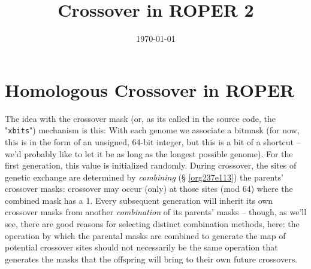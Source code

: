 \documentclass[11pt]{article}
\date{\today}
\title{Crossover in ROPER 2}
\begin{document}
\maketitle
\tableofcontents


\section{Homologous Crossover in ROPER}
\label{sec:org2bd754a}
The idea with the crossover mask (or, as its called in the source code, the
"\texttt{xbits}") mechanism is this: With each genome we associate a bitmask (for now,
this is in the form of an unsigned, 64-bit integer, but this is a bit of a
shortcut -- we'd probably like to let it be as long as the longest possible
genome). For the first generation, this value is initialized randomly. During
crossover, the sites of genetic exchange are determined by \emph{combining} (\S
\ref{org237e113}) the parents' crossover masks: crossover may occur (only) at
those sites (mod 64) where the combined mask has a 1. Every subsequent generation
will inherit its own crossover masks from another \emph{combination} of its parents'
masks -- though, as we'll see, there are good reasons for selecting distinct
combination methods, here: the operation by which the parental masks are combined
to generate the map of potential crossover sites should not necessarily be the
same operation that generates the masks that the offspring will bring to their
own future crossovers.
\end{document}
